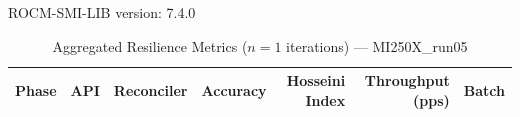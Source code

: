 ROCM-SMI-LIB version: 7.4.0

\begin{table}[htbp]
\caption{Aggregated Resilience Metrics ($n=1$ iterations) --- MI250X_run05}
\begin{tabular}{l l l r r r r}
\hline
Phase & API & Reconciler & Accuracy & Hosseini Index & Throughput (pps) & Batch \\
\hline
\hline
\end{tabular}
\end{table}
